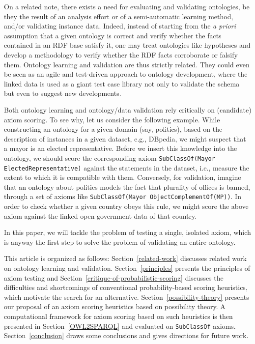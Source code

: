 \documentclass[review]{elsarticle}
\theoremstyle{definition}
\begin{document}
On a related note, there exists a need for evaluating and validating ontologies,
be they the result of an analysis effort or of a semi-automatic learning method,
and/or validating instance data.
Indeed, instead of starting from the \emph{a priori} assumption that a given ontology
is correct and verify whether the facts contained in an RDF base satisfy it,
one may treat ontologies like hypotheses and develop a methodology to verify
whether the RDF facts corroborate or falsify them. Ontology learning and validation
are thus strictly related.
They could even be seen as an agile and test-driven approach to ontology development,
where the linked data is used as a giant test case library not only to validate the
schema but even to suggest new developments.

Both ontology learning and ontology/data validation rely critically on (candidate) axiom scoring. To see why, let us consider the following example.
While constructing an ontology for a given domain (say, politics),
based on the description of instances in a given dataset, e.g., DBpedia,
we might suspect that a mayor is an elected representative. Before we insert this
knowledge into the ontology, we should score the corresponding axiom
\texttt{SubClassOf(Mayor ElectedRepresentative)} against the statements in the
dataset, i.e., measure the extent to which it is compatible with them.
Conversely, for validation, imagine that an ontology about politics models the fact that plurality of offices
is banned, through a set of axioms like \texttt{SubClassOf(Mayor ObjectComplementOf(MP))}. In order to check whether a given country obeys this rule, we might score
the above axiom against the linked open government data of that country.

In this paper, we will tackle the problem of testing a single, isolated axiom,
which is anyway the first step to solve the problem of validating an entire ontology.

This article is organized as follows:
Section~\ref{related-work} discusses related work on ontology learning and validation. Section~\ref{principles} presents the principles of axiom testing and
Section~\ref{critique-of-probabilistic-scoring} discusses the difficulties and
shortcomings of conventional probability-based scoring heuristics, which motivate
the search for an alternative.
Section~\ref{possibility-theory}
presents our proposal of an axiom scoring heuristics based on possibility theory.
A computational framework for axiom scoring based on such heuristics is then
presented in Section~\ref{OWL2SPARQL} and evaluated on \texttt{SubClassOf} axioms.
Section~\ref{conclusion} draws some conclusions and gives directions for future work.
\end{document}
